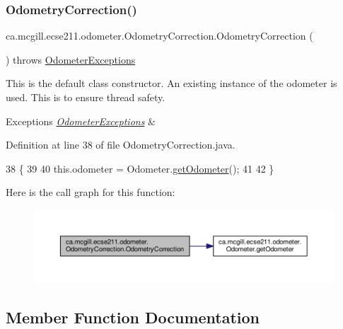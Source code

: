 \subsubsection{\texorpdfstring{Odometry\+Correction()}{OdometryCorrection()}}
{\footnotesize\ttfamily ca.\+mcgill.\+ecse211.\+odometer.\+Odometry\+Correction.\+Odometry\+Correction (\begin{DoxyParamCaption}{ }\end{DoxyParamCaption}) throws \hyperlink{classca_1_1mcgill_1_1ecse211_1_1odometer_1_1_odometer_exceptions}{Odometer\+Exceptions}}

This is the default class constructor. An existing instance of the odometer is used. This is to ensure thread safety.


\begin{DoxyExceptions}{Exceptions}
{\em \hyperlink{classca_1_1mcgill_1_1ecse211_1_1odometer_1_1_odometer_exceptions}{Odometer\+Exceptions}} & \\
\hline
\end{DoxyExceptions}


Definition at line 38 of file Odometry\+Correction.\+java.


\begin{DoxyCode}
38                                                         \{
39 
40     this.odometer = Odometer.\hyperlink{classca_1_1mcgill_1_1ecse211_1_1odometer_1_1_odometer_a99171f11e34dea918fa9dd069d721439}{getOdometer}();
41 
42   \}
\end{DoxyCode}
Here is the call graph for this function\+:\nopagebreak
\begin{figure}[H]
\begin{center}
\leavevmode
\includegraphics[width=350pt]{classca_1_1mcgill_1_1ecse211_1_1odometer_1_1_odometry_correction_ad80b45e0bc4bf935494e075edcec739c_cgraph}
\end{center}
\end{figure}


\subsection{Member Function Documentation}
\mbox{\label{classca_1_1mcgill_1_1ecse211_1_1odometer_1_1_odometry_correction_a21a351682dc75060d6a5f15ad4775068}} 
